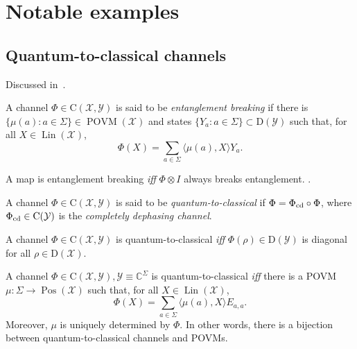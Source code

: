 \documentclass[12pt]{report}
\newcommand{\CC}{\mathbb{C}}
\newcommand{\on}[1]{\operatorname{#1}}
\newcommand{\calY}{{\mathcal{Y}}}
\newcommand{\calX}{{\mathcal{X}}}
\newcommand{\rmC}{{\mathrm{C}}}
\newcommand{\rmD}{{\mathrm{D}}}
\DeclareMathOperator{\Pos}{Pos}
\DeclareMathOperator{\Lin}{Lin}
\begin{document}
\section{Notable examples}

\subsection{Quantum-to-classical channels}

Discussed in~\parencite{horodecki2003entanglement,watrous2018theory}.

\begin{defn}
	A channel $\Phi\in\rmC(\calX,\calY)$ is said to be \emph{entanglement breaking} if there is $\{\mu(a):a\in\Sigma\}\in\on{POVM}(\calX)$
	and states $\{Y_a:a\in\Sigma\}\subset\rmD(\calY)$ such that,
	for all $X\in\Lin(\calX)$,
	\begin{equation}
		\Phi(X) = \sum_{a\in\Sigma} \langle \mu(a),X\rangle Y_a.
	\end{equation}
\end{defn}

\begin{prop}
	A map is entanglement breaking \emph{iff} $\Phi\otimes I$ always breaks entanglement. .
\end{prop}

\begin{defn}
	A channel $\Phi\in\rmC(\calX,\calY)$ is said to be \emph{quantum-to-classical} if $\Phi=\Phi_{\rm cd}\circ\Phi$,
	where $\Phi_{\rm cd}\in\rmC(\calY)$ is the \emph{completely dephasing channel}.
\end{defn}


\begin{prop}
	A channel $\Phi\in\rmC(\calX,\calY)$ is quantum-to-classical \emph{iff}
	$\Phi(\rho)\in\rmD(\calY)$ is diagonal for all $\rho\in\rmD(\calX)$.
\end{prop}

\begin{prop}
	A channel $\Phi\in\rmC(\calX,\calY), \calY\equiv \CC^\Sigma$ is quantum-to-classical \emph{iff}
	there is a POVM $\mu:\Sigma\to\Pos(\calX)$ such that, for all $X\in\Lin(\calX)$,
	\begin{equation}
		\Phi(X) = \sum_{a\in\Sigma} \langle\mu(a),X\rangle E_{a,a}.
	\end{equation}
	Moreover, $\mu$ is uniquely determined by $\Phi$.
	In other words, there is a bijection between quantum-to-classical channels and POVMs.
\end{prop}
\end{document}
